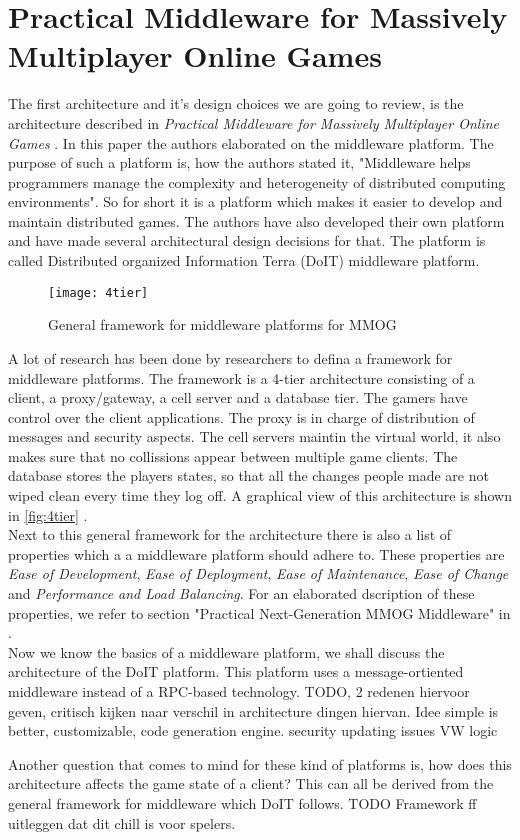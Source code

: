 \section{Practical Middleware for Massively Multiplayer Online Games}
The first architecture and it's design choices we are going to review, is the architecture described in \emph{Practical Middleware for Massively Multiplayer Online Games} \cite{middleware}.
In this paper the authors elaborated on the middleware platform. The purpose of such a platform  is, how the authors stated it, "Middleware helps programmers manage the complexity and heterogeneity of distributed computing environments". So for short it is a platform which makes it easier to develop and maintain distributed games. The authors have also developed their own platform and have made several architectural design decisions for that. The platform is called Distributed organized Information Terra (DoIT) middleware platform. \\

\begin{wrapfigure}{r}{0.5\textwidth}
\begin{center}
  \texttt{[image: 4tier]}
  \label{fig:4tier}
  \caption{General framework for middleware platforms for MMOG}
\end{center}
\end{wrapfigure}

\noindent A lot of research has been done by researchers to defina a framework for middleware platforms. The framework is a 4-tier architecture consisting of a client, a proxy/gateway, a cell server and a database tier. The gamers have control over the client applications. The proxy is in charge of distribution of messages and security aspects. The cell servers maintin the virtual world, it also makes sure that no collissions appear between multiple game clients. The database stores the players states, so that all the changes people made are not wiped clean every time they log off. A graphical view of this architecture is shown in \autoref{fig:4tier} \cite{midfig}. \\
\indent Next to this general framework for the architecture there is also a list of properties which a a middleware platform should adhere to. These properties are \emph{Ease of Development}, \emph{Ease of Deployment}, \emph{Ease of Maintenance}, \emph{Ease of Change} and \emph{Performance and Load Balancing}. For an elaborated dscription of these properties, we refer to section "Practical Next-Generation MMOG Middleware" in \cite{middleware}.\\
Now we know the basics of  a middleware platform, we shall discuss the architecture of the DoIT platform. This platform uses a message-ortiented middleware instead of a RPC-based technology. 
TODO, 2 redenen hiervoor geven, critisch kijken naar verschil in architecture dingen hiervan.
Idee simple is better, customizable, 
code generation engine. 
security updating issues
VW logic

Another question that comes to mind for these kind of platforms is, how does this architecture affects the game state of a client? This can all be derived from the general framework for middleware which DoIT follows.
TODO Framework ff uitleggen dat dit chill is voor spelers.